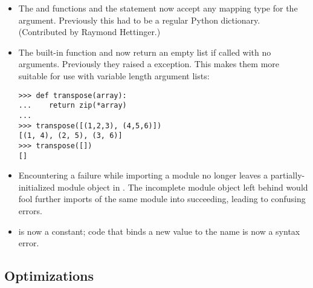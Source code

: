 \documentclass{howto}
\begin{document}
\begin{itemize}
\item The 
and 
functions and the  statement now accept any mapping type
for the  argument.  Previously this had to be a regular
Python dictionary.  (Contributed by Raymond Hettinger.)

\item The  built-in function and 
  now return an empty list if called with no arguments.
  Previously they raised a 
  exception.  This makes them more
  suitable for use with variable length argument lists:

\begin{verbatim}
>>> def transpose(array):
...    return zip(*array)
...
>>> transpose([(1,2,3), (4,5,6)])
[(1, 4), (2, 5), (3, 6)]
>>> transpose([])
[]
\end{verbatim}

\item Encountering a failure while importing a module no longer leaves
a partially-initialized module object in .  The
incomplete module object left behind would fool further imports of the
same module into succeeding, leading to confusing errors.  

\item {} is now a constant; code that binds a new value to 
the name  is now a syntax error.

\end{itemize}


\subsection{Optimizations}
\end{document}
